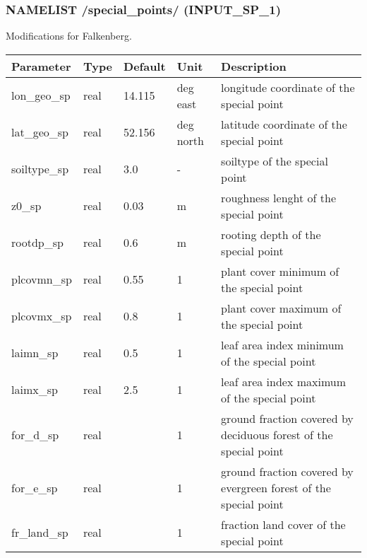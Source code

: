 \documentclass[a4paper,10pt,DIV14,BCOR1cm,titlepage,twoside]{scrartcl}
\providecommand{\tabularnewline}{\\}
\begin{document}
\subsubsection*{NAMELIST /special\_points/ (INPUT\_SP\_1)}
Modifications for Falkenberg.\\
\begin{longtable}{|p{4cm}|p{1.5cm}|p{1.5cm}|p{1cm}|p{6cm}|}
\hline 
\textbf{Parameter}& \textbf{Type}& \textbf{Default}& \textbf{Unit}& \textbf{Description}
\tabularnewline
\hline
\endhead
\hline 
lon\_geo\_sp & real & 14.115 & deg east & longitude coordinate of the special point\tabularnewline\hline
lat\_geo\_sp & real & 52.156 & deg north & latitude coordinate of the special point\tabularnewline\hline
soiltype\_sp & real & 3.0 & - & soiltype of the special point\tabularnewline\hline
z0\_sp & real & 0.03 & m & roughness lenght of the special point\tabularnewline\hline
rootdp\_sp & real & 0.6 & m & rooting depth of the special point\tabularnewline\hline
plcovmn\_sp & real & 0.55 & 1 & plant cover minimum of the special point\tabularnewline\hline
plcovmx\_sp & real & 0.8 & 1 &plant cover maximum of the special point\tabularnewline\hline
laimn\_sp & real & 0.5 & 1 & leaf area index minimum of the special point\tabularnewline\hline
laimx\_sp & real & 2.5 & 1 &leaf area index maximum of the special point\tabularnewline\hline
for\_d\_sp & real & & 1 & ground fraction covered by deciduous forest of the special point\tabularnewline\hline
for\_e\_sp & real & & 1 & ground fraction covered by evergreen forest of the special point\tabularnewline\hline
fr\_land\_sp & real & & 1 & fraction land cover of the special point\tabularnewline\hline
\bottomrule
\end{longtable}
\end{document}
